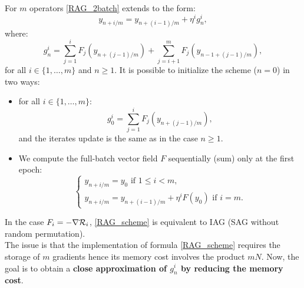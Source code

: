 For $m$ operators \eqref{RAG_2batch} extends to the form:
\begin{equation}
	y_{n+i/m} = y_{n+(i-1)/m}+\eta^i g_n^i,
	\label{RAG_scheme}
\end{equation}
where:
\begin{equation}
	g_n^i = \sum_{j=1}^i F_j\left(y_{n+(j-1)/m}\right)+\sum_{j=i+1}^m F_j\left(y_{n-1+(j-1)/m}\right),
	\label{gni}
\end{equation}
for all $i \in \{1,\dots,m\}$ and $n\geq 1$. It is possible to initialize the scheme ($n=0$) in two ways:
\begin{itemize}
	\item for all $i\in \{1,\dots,m\}$:
	\begin{equation*}
		g_0^i = \sum_{j=1}^i F_j\left(y_{n+(j-1)/m}\right),
	\end{equation*}
	and the iterates update is the same as in the case $n\geq 1$.
	\item We compute the full-batch vector field $F$ sequentially (sum) only at the first epoch:
	\begin{equation*}
		\left\{
		\begin{array}{ll}
			y_{n+i/m}=y_0 \text{ if } 1\leq i<m, \\
			y_{n+i/m} = y_{n+(i-1)/m}+\eta^i F(y_0) \text{ if } i=m.
		\end{array}
		\right.
	\end{equation*}
\end{itemize}
In the case $F_i=-\nabla \mathcal{R}_i$, \eqref{RAG_scheme} is equivalent to IAG (SAG without random permutation). \\
The issue is that the implementation of formula \eqref{RAG_scheme} requires the storage of $m$ gradients hence its memory cost involves the product $mN$. Now, the goal is to obtain a \textbf{close approximation of $g_n^i$ by reducing the memory cost}.

